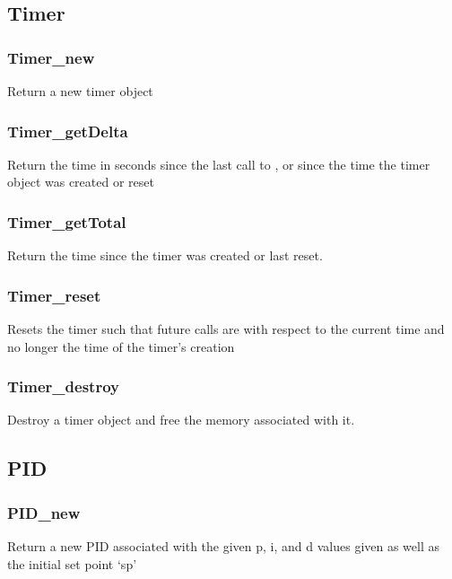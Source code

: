 \subsection{Timer} \label{apitimer}
\subsubsection{Timer\_new} \label{apitimernew}
 Return a new timer object

\subsubsection{Timer\_getDelta} \label{apitimerdelta}
 Return the time in seconds since the 
last call to , or since the time the timer object was
created or reset

\subsubsection{Timer\_getTotal} \label{apitimertotal}
 Return the time since the timer was 
created or last reset.

\subsubsection{Timer\_reset} \label{apitimerreset}
 Resets the timer such that future 
 calls are with respect to the current time and no longer the 
time of the timer's creation

\subsubsection{Timer\_destroy} \label{apitimerdestroy}
 Destroy a timer object and free the memory
associated with it.

\subsection{PID} \label{apipid}
\subsubsection{PID\_new} \label{apipidnew}
 Return a new PID
associated with the given p, i, and d values given as well as the initial set
point `sp'

